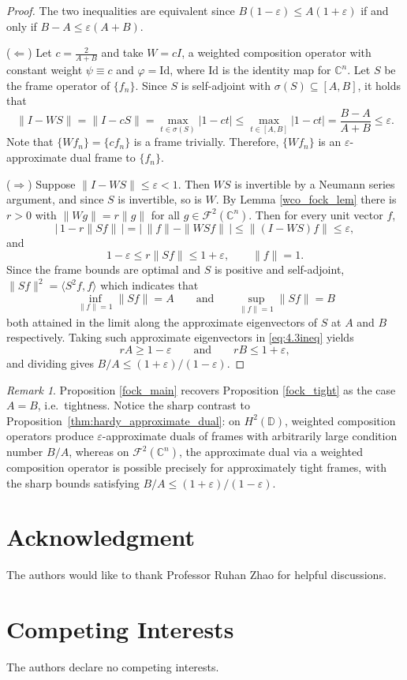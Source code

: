 \documentclass{amsart}
\theoremstyle{definition}
\theoremstyle{remark}
\newtheorem{remark}[thm]{Remark}
\numberwithin{equation}{section}
\begin{document}
\begin{proof}
The two inequalities are equivalent since
$B(1-\varepsilon) \le A(1+\varepsilon)$ if and only if
$B - A \le \varepsilon(A + B)$.

($\Leftarrow$) Let $c = \tfrac{2}{A+B}$ and take $W = cI$, a weighted
composition operator with constant weight $\psi \equiv c$ and
$\varphi = \mathrm{Id}$, where $\mathrm{Id}$ is the identity map for $\mathbb{C}^n$. Let $S$ be the frame operator of $\{f_n\}$.  Since $S$ is self-adjoint with
$\sigma(S) \subseteq [A, B]$, it holds that
\[
\|I - WS\| = \|I - cS\|
= \max_{t \in \sigma(S)} |1 - ct|
\le \max_{t \in [A,B]} |1 - ct|
= \frac{B-A}{A+B} \le \varepsilon.
\]
Note
that $\{Wf_n\} = \{cf_n\}$ is a frame trivially. Therefore, $\{Wf_n\}$ is an $\varepsilon$-approximate dual frame to $\{f_n\}$.

($\Rightarrow$) Suppose $\|I - WS\| \le \varepsilon < 1$. Then $WS$
is invertible by a Neumann series argument, and since $S$ is
invertible, so is $W$. By Lemma \ref{wco_fock_lem} there is
$r > 0$ with $\|Wg\| = r\|g\|$ for all $g \in \mathcal{F}^2(\mathbb{C}^n)$.
Then for every unit vector $f$,
\[
\bigl|\,1 - r\|Sf\|\,\bigr| = \bigl|\,\|f\| - \|WSf\|\,\bigr|
   \le \|(I-WS)f\| \le \varepsilon,
\]
and
\begin{equation}\label{eq:4.3ineq}
1 - \varepsilon \le r\|Sf\| \le 1 + \varepsilon,
\qquad \|f\| = 1.
\end{equation}
Since the frame bounds are optimal and $S$ is positive and self-adjoint,
$\|Sf\|^2 = \langle S^2 f, f\rangle$ which indicates that
\[
\inf_{\|f\|=1} \|Sf\| = A
\qquad\text{and}\qquad
\sup_{\|f\|=1} \|Sf\| = B
\]
both attained in the limit along the approximate eigenvectors of $S$ at
$A$ and $B$ respectively. Taking such approximate eigenvectors in
\eqref{eq:4.3ineq} yields
\[
rA \ge 1 - \varepsilon
\qquad\text{and}\qquad
rB \le 1 + \varepsilon,
\]
and dividing gives $B/A \le (1+\varepsilon)/(1-\varepsilon)$.
\end{proof}
\begin{remark}
Proposition \ref{fock_main} recovers Proposition \ref{fock_tight} as the case $A = B$, i.e.\ tightness. Notice the sharp contrast to Proposition~\ref{thm:hardy_approximate_dual}: on $H^2(\mathbb{D})$,
weighted composition operators produce $\varepsilon$-approximate
duals of frames with arbitrarily large condition number $B/A$,
whereas on $\mathcal{F}^2(\mathbb{C}^n)$, the approximate dual via a weighted
composition operator is possible precisely for approximately tight
frames, with the sharp bounds satisfying
$B/A \le (1+\varepsilon)/(1-\varepsilon)$. 
\end{remark}
\section*{Acknowledgment}
The authors would like to thank Professor Ruhan Zhao for helpful discussions. 

\section*{Competing Interests}
The authors declare no competing interests.


\end{document}
